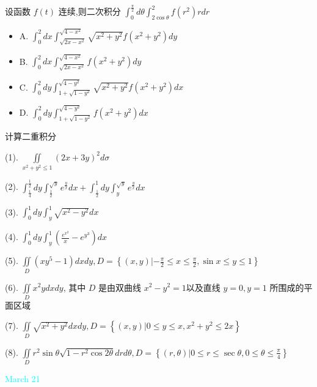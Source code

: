 \begin{example}[][Exam: 29.3.11]
	设函数 $f(t)$ 连续,则二次积分 $\int_{0}^{\frac{\pi}{2}}d\theta\int_{2\cos\theta}^{2}f(r^{2})rdr$
\begin{itemize}
	\item A. $\int_{0}^{2}dx\int_{\sqrt{2x-x^{2}}}^{\sqrt{4-x^{2}}}\sqrt{x^{2}+y^{2}}f(x^{2}+y^{2})dy$
	\item B. $\int_{0}^{2}dx\int_{\sqrt{2x-x^{2}}}^{\sqrt{4-x^{2}}}f(x^{2}+y^{2})dy$
	\item C. $\int_{0}^{2}dy\int_{1+\sqrt{1-y^{2}}}^{\sqrt{4-y^{2}}}\sqrt{x^{2}+y^{2}}f(x^{2}+y^{2})dx$
	\item D. $\int_{0}^{2}dy\int_{1+\sqrt{1-y^{2}}}^{\sqrt{4-y^{2}}}f(x^{2}+y^{2})dx$
\end{itemize}
\end{example}

\begin{example}[][Exam: 29.3.12]
	计算二重积分

(1). $\iint\limits_{x^{2}+y^{2}\leq 1}(2x+3y)^{2}d\sigma$

(2). $\int_{\frac{1}{4}}^{\frac{1}{2}}dy\int_{\frac{1}{2}}^{\sqrt{y}}e^{\frac{y}{x}}dx+\int_{\frac{1}{2}}^{1}dy\int_{y}^{\sqrt{y}}e^{\frac{y}{x}}dx$

(3). $\int_{0}^{1}dy\int_{y}^{1}\sqrt{x^{2}-y^{2}}dx$

(4). $\int_{0}^{1}dy\int_{y}^{1}\left(\frac{e^{x^{2}}}{x}-e^{y^{3}}\right)dx$

(5). $\iint\limits_{D}\left(xy^{5}-1\right)dxdy,D=\left\{(x,y)|-\frac{\pi}{2}\leq x \leq \frac{\pi}{2},\sin x\leq y \leq 1 \right\}$

(6). $\iint\limits_{D}x^{2}ydxdy$, 其中 $D$ 是由双曲线 $x^{2}-y^{2}=1$以及直线 $y=0,y=1$ 所围成的平面区域

(7). $\iint\limits_{D}\sqrt{x^{2}+y^{2}}dxdy,D=\left\{(x,y)|0\leq y \leq x, x^{2}+y^{2}\leq 2x\right\}$

(8). $\iint\limits_{D}r^{2}\sin\theta\sqrt{1-r^{2}\cos 2\theta}drd\theta,D=\left\{(r,\theta)|0\leq r\leq \sec\theta,0\leq \theta \leq \frac{\pi}{4}\right\}$
\end{example}

\textcolor{cyan}{March 21}

